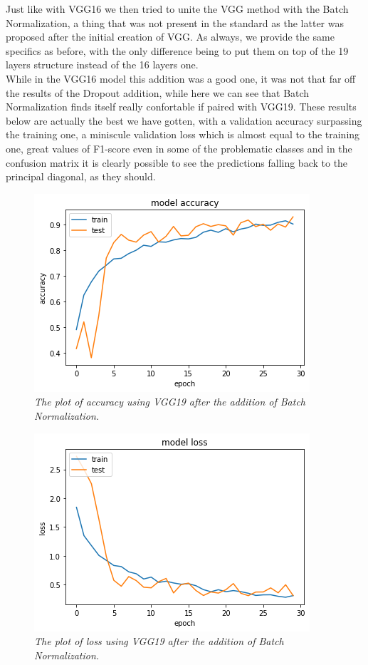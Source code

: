 \documentclass[12pt,a4paper]{report}
\begin{document}
Just like with VGG16 we then tried to unite the VGG method with the Batch Normalization, a thing that was not present in the standard as the latter was proposed after the initial creation of VGG. As always, we provide the same specifics as before, with the only difference being to put them on top of the 19 layers structure instead of the 16 layers one. \\
While in the VGG16 model this addition was a good one, it was not that far off the results of the Dropout addition, while here we can see that Batch Normalization finds itself really confortable if paired with VGG19. These results below are actually the best we have gotten, with a validation accuracy surpassing the training one, a miniscule validation loss which is almost equal to the training one, great values of F1-score even in some of the problematic classes and in the confusion matrix it is clearly possible to see the predictions falling back to the principal diagonal, as they should.
\begin{figure}[H]
\centering
\includegraphics[scale=0.45]{./immagini/vgg19/2_data_augmentation_-_30_epochs_no_stopping_-_dropout_0p5_-_classifier_batch_norm/plot1.png}
\caption{\textit{The plot of accuracy using VGG19 after the addition of Batch Normalization.}}
\end{figure}
\begin{figure}[H]
\centering
\includegraphics[scale=0.45]{./immagini/vgg19/2_data_augmentation_-_30_epochs_no_stopping_-_dropout_0p5_-_classifier_batch_norm/plot2.png}
\caption{\textit{The plot of loss using VGG19 after the addition of Batch Normalization.}}
\end{figure}
\end{document}
